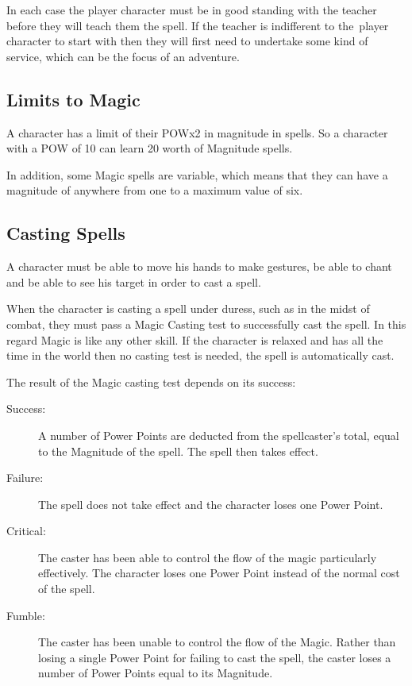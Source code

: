 In each case the player character must be in good standing with the teacher before they will teach them the spell. If the teacher is indifferent to the player character to start with then they will first need to undertake some kind of service, which can be the focus of an adventure.

\subsection{Limits to Magic}
A character has a limit of their POWx2 in magnitude in spells. So a character with a POW of 10 can learn 20 worth of Magnitude spells.

In addition, some Magic spells are variable, which means that they can have a magnitude of anywhere from one to a maximum value of six.


\subsection{Casting Spells}
A character must be able to move his hands to make gestures, be able to chant and be able to see his target in order to cast a spell.

When the character is casting a spell under duress, such as in the midst of combat, they must pass a Magic Casting test to successfully cast the spell. In this regard Magic is like any other skill. If the character is relaxed and has all the time in the world then no casting test is needed, the spell is automatically cast.

The result of the Magic casting test depends on its success:
\begin{description}
	\item[Success:] A number of Power Points are deducted from the spellcaster’s total, equal to the Magnitude of the spell. The spell then takes effect.
	\item[Failure:] The spell does not take effect and the character loses one Power Point.
	\item[Critical:] The caster has been able to control the flow of the magic particularly effectively. The character loses one Power Point instead of the normal cost of the spell.
	\item[Fumble:] The caster has been unable to control the flow of the Magic. Rather than losing a single Power Point for failing to cast the spell, the caster loses a number of Power Points equal to its Magnitude. 
\end{description}

